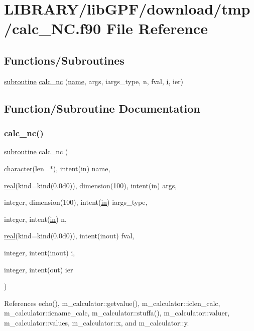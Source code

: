 \hypertarget{calc__NC_8f90}{}\section{L\+I\+B\+R\+A\+R\+Y/lib\+G\+P\+F/download/tmp/calc\+\_\+\+NC.f90 File Reference}
\label{calc__NC_8f90}
\subsection*{Functions/\+Subroutines}
\begin{DoxyCompactItemize}
\item 
\hyperlink{M__stopwatch_83_8txt_acfbcff50169d691ff02d4a123ed70482}{subroutine} \hyperlink{calc__NC_8f90_a099c0657056c90b5f187d2f17a292ffc}{calc\+\_\+nc} (\hyperlink{M__stopwatch_83_8txt_a3f508a893ae4c3b397b4383e33b9bcae}{name}, args, iargs\+\_\+type, n, fval, \hyperlink{intro__blas1_83_8txt_a8ba82a50c0c2c12d5f6a77f7e4651c0b}{i}, ier)
\end{DoxyCompactItemize}


\subsection{Function/\+Subroutine Documentation}
\mbox{\label{calc__NC_8f90_a099c0657056c90b5f187d2f17a292ffc}} 
\subsubsection{\texorpdfstring{calc\+\_\+nc()}{calc\_nc()}}
{\footnotesize\ttfamily \hyperlink{M__stopwatch_83_8txt_acfbcff50169d691ff02d4a123ed70482}{subroutine} calc\+\_\+nc (\begin{DoxyParamCaption}\item[{\hyperlink{option__stopwatch_83_8txt_abd4b21fbbd175834027b5224bfe97e66}{character}(len=$\ast$), intent(\hyperlink{M__journal_83_8txt_afce72651d1eed785a2132bee863b2f38}{in})}]{name,  }\item[{\hyperlink{read__watch_83_8txt_abdb62bde002f38ef75f810d3a905a823}{real}(kind=kind(0.\+0d0)), dimension(100), intent(in)}]{args,  }\item[{integer, dimension(100), intent(\hyperlink{M__journal_83_8txt_afce72651d1eed785a2132bee863b2f38}{in})}]{iargs\+\_\+type,  }\item[{integer, intent(\hyperlink{M__journal_83_8txt_afce72651d1eed785a2132bee863b2f38}{in})}]{n,  }\item[{\hyperlink{read__watch_83_8txt_abdb62bde002f38ef75f810d3a905a823}{real}(kind=kind(0.\+0d0)), intent(inout)}]{fval,  }\item[{integer, intent(inout)}]{i,  }\item[{integer, intent(out)}]{ier }\end{DoxyParamCaption})}



References echo(), m\+\_\+calculator\+::getvalue(), m\+\_\+calculator\+::iclen\+\_\+calc, m\+\_\+calculator\+::icname\+\_\+calc, m\+\_\+calculator\+::stuffa(), m\+\_\+calculator\+::valuer, m\+\_\+calculator\+::values, m\+\_\+calculator\+::x, and m\+\_\+calculator\+::y.

